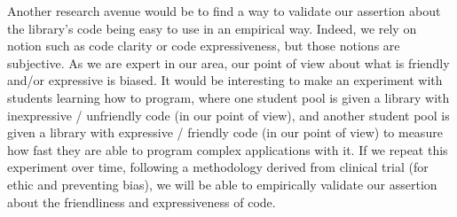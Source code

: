 Another research avenue would be to find a way to validate our assertion about the library's code being easy to use in
an empirical way. Indeed, we rely on notion such as code clarity or code expressiveness, but those notions are
subjective. As we are expert in our area, our point of view about what is friendly and/or expressive is biased. It would
be interesting to make an experiment with students learning how to program, where one student pool is given a library
with inexpressive / unfriendly code (in our point of view), and another student pool is given a library with expressive
/ friendly code (in our point of view) to measure how fast they are able to program complex applications with it. If we
repeat this experiment over time, following a methodology derived from clinical trial (for ethic and preventing bias),
we will be able to empirically validate our assertion about the friendliness and expressiveness of code.




